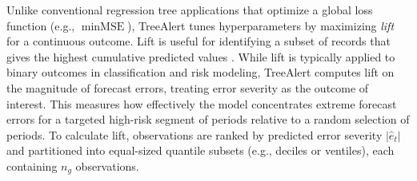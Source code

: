\documentclass[12pt]{article}
\begin{document}
Unlike conventional regression tree applications that optimize a global loss function (e.g., $\min \text{MSE}$), TreeAlert tunes hyperparameters by maximizing \emph{lift} for a continuous outcome. Lift is useful for identifying a subset of records that gives the highest cumulative predicted values \citep{shmueli2023machineR}. While lift is typically applied to binary outcomes in classification and risk modeling, TreeAlert computes lift on the magnitude of forecast errors, treating error severity as the outcome of interest. This measures how effectively the model concentrates extreme forecast errors for a targeted high-risk segment of periods relative to a random selection of periods. To calculate lift, observations are ranked by predicted error severity $|\hat{e}_t|$ and partitioned into equal-sized quantile subsets (e.g., deciles or ventiles), each containing \( n_g \) observations. %


\end{document}
